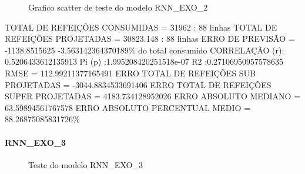 \documentclass[	12pt, Times, openright, twoside, a4paper, english, brazil]{abntex2}
\begin{document}
                \begin{figure}[!ht]
                  \caption{Grafico scatter de teste do modelo RNN\_EXO\_2 \label{fig:case2_rnn_exo_2_test_scatter} }
                \end{figure}
                TOTAL DE REFEIÇÕES CONSUMIDAS = 31962 : 88 linhas\newline
                TOTAL DE REFEIÇÕES PROJETADAS = 30823.148 : 88 linhas\newline
                ERRO DE PREVISÃO = -1138.8515625 -3.563142364370189\% do total consumido\newline
                CORRELAÇÃO (r): 0.5206433612135913 Pi (p) :1.995208420251518e-07 R2 :0.27106950957578635\newline
                RMSE = 112.99211377165491\newline
                ERRO TOTAL DE REFEIÇÕES SUB PROJETADAS = -3044.8834533691406\newline
                ERRO TOTAL DE REFEIÇÕES SUPER PROJETADAS = 4183.734128952026\newline
                ERRO ABSOLUTO MEDIANO = 63.59894561767578\newline
                ERRO ABSOLUTO PERCENTUAL MEDIO = 88.26875085831726\%\newline
              \paragraph{RNN\_EXO\_3}
                \begin{figure}[!ht]
                  \caption{Teste do modelo RNN\_EXO\_3 \label{fig:case3_rnn_exo_3_test} }
                \end{figure}
\end{document}
